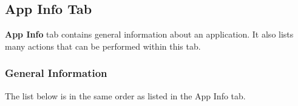 \subsection{App Info Tab}\label{subsec:app-info-tab} %
\textbf{App Info} tab contains general information about an application. It also lists many actions that can be
performed within this tab.

\subsubsection{General Information}\label{subsubsec:app-info-general-information} %
The list below is in the same order as listed in the App Info tab.
